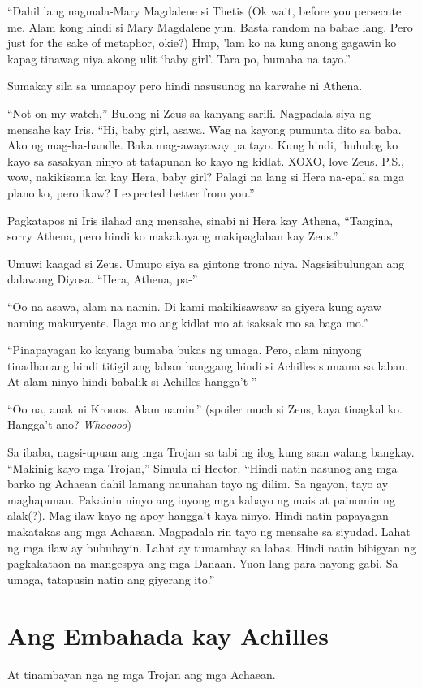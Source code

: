 \documentclass[12pt,letterpaper]{report}
\begin{document}
``Dahil lang nagmala-Mary Magdalene si Thetis (Ok wait, before you persecute me. Alam kong hindi si Mary Magdalene yun. Basta random na babae lang. Pero just for the sake of metaphor, okie?) Hmp, 'lam ko na kung anong gagawin ko kapag tinawag niya akong ulit `baby girl'. Tara po, bumaba na tayo.''

Sumakay sila sa umaapoy pero hindi nasusunog na karwahe ni Athena.

``Not on my watch,'' Bulong ni Zeus sa kanyang sarili. Nagpadala siya ng mensahe kay Iris. ``Hi, baby girl, asawa. Wag na kayong pumunta dito sa baba. Ako ng mag-ha-handle. Baka mag-awayaway pa tayo. Kung hindi, ihuhulog ko kayo sa sasakyan ninyo at tatapunan ko kayo ng kidlat. XOXO, love Zeus. P.S., wow, nakikisama ka kay Hera, baby girl? Palagi na lang si Hera na-epal sa mga plano ko, pero ikaw? I expected better from you.''

Pagkatapos ni Iris ilahad ang mensahe, sinabi ni Hera kay Athena, ``Tangina, sorry Athena, pero hindi ko makakayang makipaglaban kay Zeus.''

Umuwi kaagad si Zeus. Umupo siya sa gintong trono niya. Nagsisibulungan ang dalawang Diyosa. ``Hera, Athena, pa-''

``Oo na asawa, alam na namin. Di kami makikisawsaw sa giyera kung ayaw naming makuryente. Ilaga mo ang kidlat mo at isaksak mo sa baga mo.''

``Pinapayagan ko kayang bumaba bukas ng umaga. Pero, alam ninyong tinadhanang hindi titigil ang laban hanggang hindi si Achilles sumama sa laban. At alam ninyo hindi babalik si Achilles hangga't-''


``Oo na, anak ni Kronos. Alam namin.'' (spoiler much si Zeus, kaya tinagkal ko. Hangga't ano? \textit{Whooooo})
 
Sa ibaba, nagsi-upuan ang mga Trojan sa tabi ng ilog kung saan walang bangkay. ``Makinig kayo mga Trojan,'' Simula ni Hector. ``Hindi natin nasunog ang mga barko ng Achaean dahil lamang naunahan tayo ng dilim. Sa ngayon, tayo ay maghapunan. Pakainin ninyo ang inyong mga kabayo ng mais at painomin ng alak(?). Mag-ilaw kayo ng apoy hangga't kaya ninyo. Hindi natin papayagan makatakas ang mga Achaean. Magpadala rin tayo ng mensahe sa siyudad. Lahat ng mga ilaw ay bubuhayin. Lahat ay tumambay sa labas. Hindi natin bibigyan ng pagkakataon na mangespya ang mga Danaan. Yuon lang para nayong gabi. Sa umaga, tatapusin natin ang giyerang ito.''
\pagebreak
\chapter{Ang Embahada kay Achilles}
At tinambayan nga ng mga Trojan ang mga Achaean.
\end{document}
